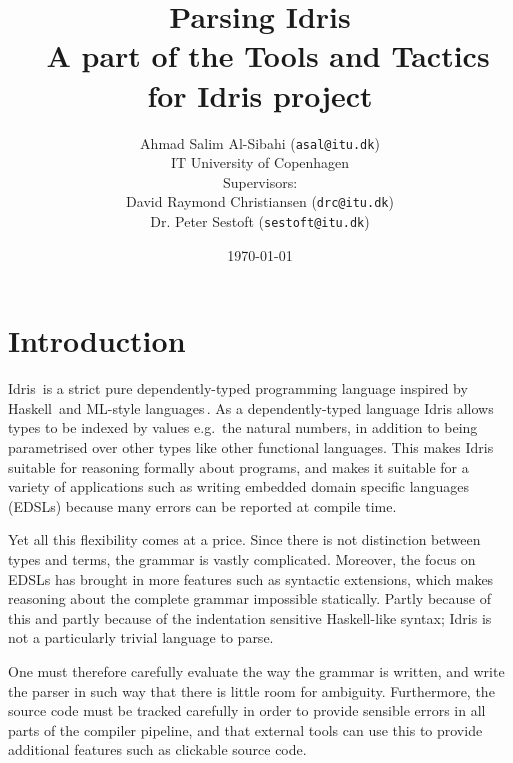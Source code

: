 \documentclass[a4paper]{article}%
\begin{document}
\title{Parsing Idris \\ \normalsize{A part of the Tools and Tactics for Idris project}}
\author{Ahmad Salim Al-Sibahi (\texttt{asal@itu.dk}) \\IT University of Copenhagen\\Supervisors: \\David Raymond Christiansen (\texttt{drc@itu.dk})\\ Dr. Peter Sestoft (\texttt{sestoft@itu.dk})}
\date{\today}


\maketitle
\lstset{basicstyle=\scriptsize\unicodemonofamily, captionpos=b, extendedchars=false, numbers=left, stepnumber=3, firstnumber=1, language=Haskell}



\section{Introduction}
\label{sec:Introduction}

Idris\,\cite{brady2013idris} is a strict pure dependently-typed programming language inspired by Haskell\,\cite{marlow2010haskell} and ML-style languages\,\cite{milner1997definition}.
As a dependently-typed language Idris allows types to be indexed by values e.g.\ the natural numbers, in addition to being parametrised over other types
like other functional languages.
This makes Idris suitable for reasoning formally about programs, and makes it suitable for a variety of applications
such as writing  embedded domain specific languages (EDSLs) because many errors can be reported at compile time.

Yet all this flexibility comes at a price.
Since there is not distinction between types and terms, the grammar is vastly complicated. Moreover, the focus on EDSLs has brought in more features such as syntactic extensions,
which makes reasoning about the complete grammar impossible statically.
Partly because of this and partly because of the indentation sensitive Haskell-like syntax; Idris is not a particularly trivial language to parse.

One must therefore carefully evaluate the way the grammar is written, and write the parser in such way that there is little room for ambiguity.
Furthermore, the source code must be tracked carefully in order to provide sensible errors in all parts of the compiler pipeline, and that external tools can use this to provide additional features such as clickable source code.
\end{document}

